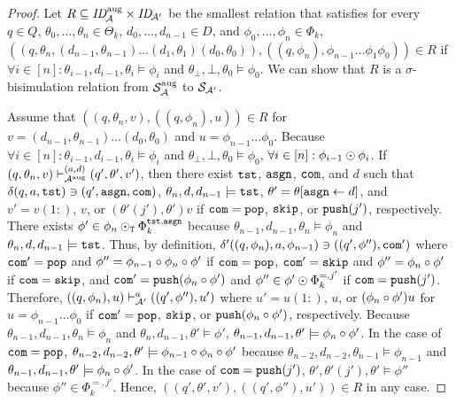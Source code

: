 \begin{proof}
Let $R\subseteq \mathit{ID}_{\!{\cal A}}^{\mathrm{aug}}\times\mathit{ID}_{\!{\cal A}'}$
be the smallest relation
that satisfies
for every $q\in Q$, $\theta_0,\ldots,\theta_n\in\Theta_k$,
$d_0,\ldots,d_{n-1}\in D$, and $\phi_0,\ldots,\phi_n\in\Phi_k$,
$((q,\theta_n,(d_{n-1},\theta_{n-1})\allowbreak\ldots\allowbreak
(d_1,\theta_1)(d_0,\theta_0)),
((q,\phi_n),\phi_{n-1}\ldots\phi_1\phi_0))\in R$
if
$\forall i\in[n]: \theta_{i-1},d_{i-1},\theta_i\models\phi_i$ and
$\theta_{\bot},{\bot},\theta_0\models\phi_0$.
%
We can show that $R$ is a $\sigma$-bisimulation relation from
${\cal S}_{{\cal A}}^{\mathrm{aug}}$ to ${\cal S}_{{\cal A}'}$.

Assume that
$((q,\theta_n,v),\allowbreak ((q,\phi_n),u))\in R$
for $v=(d_{n-1},\theta_{n-1})\ldots(d_0,\theta_0)$ and
$u=\phi_{n-1}\ldots\phi_0$.
Because
$\forall i\in[n]: \theta_{i-1},d_{i-1},\theta_i\models\phi_i$ and
$\theta_{\bot},{\bot},\theta_0\models\phi_0$,
$\forall i\in[n]: \phi_{i-1}\odot\phi_i$.
%
If
$(q,\theta_n,v)\vdash_{{\cal A}^{\mathrm{aug}}}^{(a,d)}(q',\theta',v')$,
then
there exist $\mathtt{tst}$, $\mathtt{asgn}$, $\mathtt{com}$, and $d$ such that
$\delta(q,a,\mathtt{tst})\ni (q',\mathtt{asgn},\mathtt{com})$,
$\theta_n,d,d_{n-1}\models\mathtt{tst}$,
$\theta'=\theta[\mathtt{asgn}\gets d]$, and
$v'=v(1{:})$, $v$, or
$(\theta'(j'),\theta')v$
if $\mathtt{com}=\mathtt{pop}$, $\mathtt{skip}$, or $\mathtt{push}(j')$, respectively.
There exists $\phi'\in\phi_n\odot_{\mathtt{T}}\Phi_k^{\mathtt{tst},\mathtt{asgn}}$ because
$\theta_{n-1},d_{n-1},\theta_n\models\phi_n$ and
$\theta_n,d,d_{n-1}\models\mathtt{tst}$.
Thus, by definition,
$\delta'((q,\phi_n),a,\phi_{n-1})\allowbreak\ni ((q',\phi''),\mathtt{com}')$
where $\mathtt{com}'=\mathtt{pop}$ and $\phi''=\phi_{n-1}\circ\phi_n\circ\phi'$
if $\mathtt{com}=\mathtt{pop}$,
$\mathtt{com}'=\mathtt{skip}$ and $\phi''=\phi_n\circ\phi'$ if $\mathtt{com}=\mathtt{skip}$, and
$\mathtt{com}'=\mathtt{push}(\phi_n\circ\phi')$ and $\phi''\in\phi'\odot\Phi_k^{=,j'}$
if $\mathtt{com}=\mathtt{push}(j')$.
Therefore,
$((q,\phi_n),u)\vdash_{{\cal A}'}^a ((q',\phi''),u')$
where $u'=u(1{:})$, $u$, or
$(\phi_n\circ\phi')u$ for $u=\phi_{n-1}\ldots\phi_0$
if $\mathtt{com}'=\mathtt{pop}$, $\mathtt{skip}$, or $\mathtt{push}(\phi_n\circ\phi')$, respectively.
Because $\theta_{n-1},d_{n-1},\theta_n\models\phi_n$ and
$\theta_n,d_{n-1},\theta'\models\phi'$,
$\theta_{n-1},d_{n-1},\theta'\models\phi_n\circ\phi'$.
In the case of $\mathtt{com}=\mathtt{pop}$,
$\theta_{n-2},d_{n-2},\theta'\models\phi_{n-1}\circ\phi_n\circ\phi'$
because $\theta_{n-2},d_{n-2},\theta_{n-1}\models\phi_{n-1}$ and
$\theta_{n-1},d_{n-1},\theta'\models\phi_n\circ\phi'$.
In the case of $\mathtt{com}=\mathtt{push}(j')$,
$\theta',\theta'(j'),\theta'\models\phi''$
because $\phi''\in\Phi_k^{=,j'}$.
Hence, $((q',\theta',v'),((q',\phi''),\allowbreak u'))\in R$ in any case.


\end{proof}
